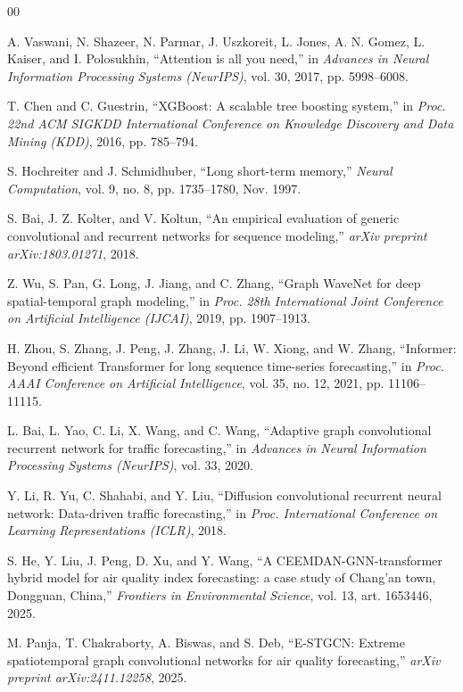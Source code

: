 \documentclass[conference]{IEEEtran}
\begin{document}
\begin{thebibliography}{00}

A. Vaswani, N. Shazeer, N. Parmar, J. Uszkoreit, L. Jones, A. N. Gomez,
L. Kaiser, and I. Polosukhin, ``Attention is all you need,'' in
\emph{Advances in Neural Information Processing Systems (NeurIPS)}, vol. 30,
2017, pp. 5998--6008.

T. Chen and C. Guestrin, ``XGBoost: A scalable tree boosting system,'' in
\emph{Proc. 22nd ACM SIGKDD International Conference on Knowledge Discovery
and Data Mining (KDD)}, 2016, pp. 785--794.

S. Hochreiter and J. Schmidhuber, ``Long short-term memory,''
\emph{Neural Computation}, vol. 9, no. 8, pp. 1735--1780, Nov. 1997.

S. Bai, J. Z. Kolter, and V. Koltun, ``An empirical evaluation of generic
convolutional and recurrent networks for sequence modeling,''
\emph{arXiv preprint arXiv:1803.01271}, 2018.

Z. Wu, S. Pan, G. Long, J. Jiang, and C. Zhang, ``Graph WaveNet for deep
spatial-temporal graph modeling,'' in \emph{Proc. 28th International Joint
Conference on Artificial Intelligence (IJCAI)}, 2019, pp. 1907--1913.

H. Zhou, S. Zhang, J. Peng, J. Zhang, J. Li, W. Xiong, and W. Zhang,
``Informer: Beyond efficient Transformer for long sequence time-series
forecasting,'' in \emph{Proc. AAAI Conference on Artificial Intelligence},
vol. 35, no. 12, 2021, pp. 11106--11115.

L. Bai, L. Yao, C. Li, X. Wang, and C. Wang, ``Adaptive graph convolutional
recurrent network for traffic forecasting,'' in
\emph{Advances in Neural Information Processing Systems (NeurIPS)},
vol. 33, 2020.

Y. Li, R. Yu, C. Shahabi, and Y. Liu, ``Diffusion convolutional recurrent
neural network: Data-driven traffic forecasting,'' in
\emph{Proc. International Conference on Learning Representations (ICLR)}, 2018.

S. He, Y. Liu, J. Peng, D. Xu, and Y. Wang, ``A CEEMDAN-GNN-transformer
hybrid model for air quality index forecasting: a case study of Chang'an
town, Dongguan, China,'' \emph{Frontiers in Environmental Science},
vol. 13, art. 1653446, 2025.

M. Panja, T. Chakraborty, A. Biswas, and S. Deb, ``E-STGCN: Extreme
spatiotemporal graph convolutional networks for air quality forecasting,''
\emph{arXiv preprint arXiv:2411.12258}, 2025.

\end{thebibliography}
\end{document}
